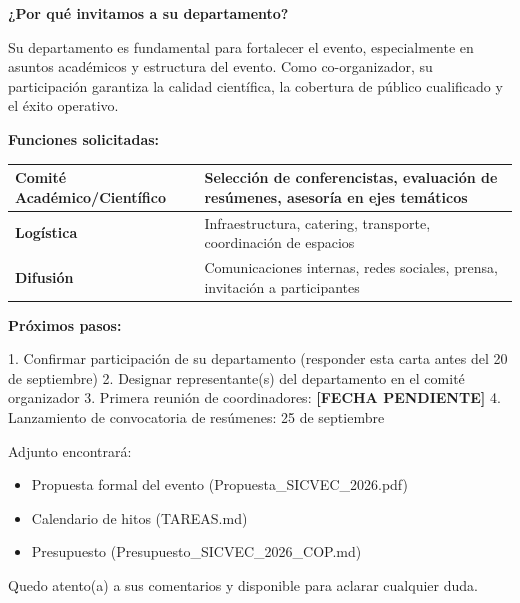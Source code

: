 \documentclass[12pt,a4paper]{article}
\begin{document}
\vspace{0.8cm}

\textbf{¿Por qué invitamos a su departamento?}

Su departamento es fundamental para fortalecer el evento, especialmente en asuntos académicos y estructura del evento. Como co-organizador, su participación garantiza la calidad científica, la cobertura de público cualificado y el éxito operativo.

\vspace{1cm}

\textbf{Funciones solicitadas:}

\begin{tabular}{|l|p{10cm}|}
\hline
\textbf{Comité Académico/Científico} & Selección de conferencistas, evaluación de resúmenes, asesoría en ejes temáticos \\
\hline
\textbf{Logística} & Infraestructura, catering, transporte, coordinación de espacios \\
\hline
\textbf{Difusión} & Comunicaciones internas, redes sociales, prensa, invitación a participantes \\
\hline
\end{tabular}

\vspace{1cm}

\textbf{Próximos pasos:}

1. Confirmar participación de su departamento (responder esta carta antes del 20 de septiembre)
2. Designar representante(s) del departamento en el comité organizador
3. Primera reunión de coordinadores: \textbf{[FECHA PENDIENTE]}
4. Lanzamiento de convocatoria de resúmenes: 25 de septiembre

\vspace{1cm}

Adjunto encontrará:
\begin{itemize}
  \item Propuesta formal del evento (Propuesta\_SICVEC\_2026.pdf)
  \item Calendario de hitos (TAREAS.md)
  \item Presupuesto (Presupuesto\_SICVEC\_2026\_COP.md)
\end{itemize}

\vspace{1cm}

Quedo atento(a) a sus comentarios y disponible para aclarar cualquier duda.

\vspace{1.5cm}
\end{document}
